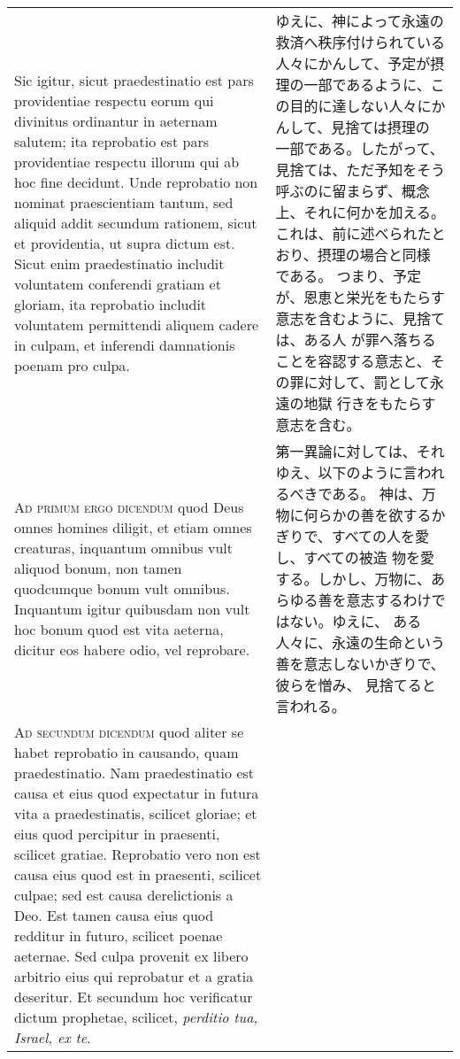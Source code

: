 \documentclass[10pt]{jsarticle} %
\begin{document}
\begin{longtable}{p{21em}p{21em}}
 \\


 Sic igitur, sicut praedestinatio est
pars providentiae respectu eorum qui divinitus ordinantur in aeternam
salutem; ita reprobatio est pars providentiae respectu illorum qui ab
hoc fine decidunt. Unde reprobatio non nominat praescientiam tantum, sed
aliquid addit secundum rationem, sicut et providentia, ut supra dictum
est. Sicut enim praedestinatio includit voluntatem conferendi gratiam et
gloriam, ita reprobatio includit voluntatem permittendi aliquem cadere
in culpam, et inferendi damnationis poenam pro culpa.


&

ゆえに、神によって永遠の救済へ秩序付けられている人々にかんして、予定が摂
 理の一部であるように、この目的に達しない人々にかんして、見捨ては摂理の
 一部である。したがって、見捨ては、ただ予知をそう呼ぶのに留まらず、概念
 上、それに何かを加える。これは、前に述べられたとおり、摂理の場合と同様
 である。
 つまり、予定が、恩恵と栄光をもたらす意志を含むように、見捨ては、ある人
 が罪へ落ちることを容認する意志と、その罪に対して、罰として永遠の地獄
 行きをもたらす意志を含む。
 

\\


{\scshape Ad primum ergo dicendum} quod Deus omnes
homines diligit, et etiam omnes creaturas, inquantum omnibus vult
aliquod bonum, non tamen quodcumque bonum vult omnibus. Inquantum igitur
quibusdam non vult hoc bonum quod est vita aeterna, dicitur eos habere
odio, vel reprobare.


&

 第一異論に対しては、それゆえ、以下のように言われるべきである。
 神は、万物に何らかの善を欲するかぎりで、すべての人を愛し、すべての被造
 物を愛する。しかし、万物に、あらゆる善を意志するわけではない。ゆえに、
 ある人々に、永遠の生命という善を意志しないかぎりで、彼らを憎み、
 見捨てると言われる。

 
\\


{\scshape Ad secundum dicendum} quod aliter se habet
reprobatio in causando, quam praedestinatio. Nam praedestinatio est
causa et eius quod expectatur in futura vita a praedestinatis, scilicet
gloriae; et eius quod percipitur in praesenti, scilicet
gratiae. Reprobatio vero non est causa eius quod est in praesenti,
scilicet culpae; sed est causa derelictionis a Deo. Est tamen causa eius
quod redditur in futuro, scilicet poenae aeternae. Sed culpa provenit ex
libero arbitrio eius qui reprobatur et a gratia deseritur. Et secundum
hoc verificatur dictum prophetae, scilicet, {\itshape perditio tua, Israel, ex te}.



\end{longtable}
\end{document}
